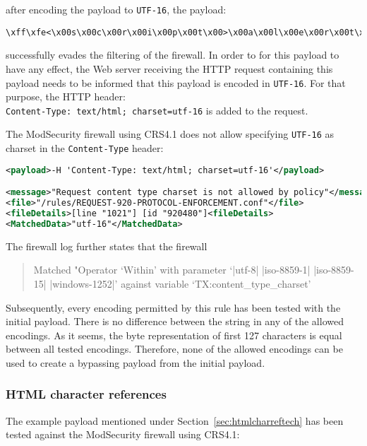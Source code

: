 after encoding the payload to \verb|UTF-16|, the payload:

\begin{lstlisting}[style=basicStyle]
\xff\xfe<\x00s\x00c\x00r\x00i\x00p\x00t\x00>\x00a\x00l\x00e\x00r\x00t\x00(\x00'\x00x\x00s\x00s\x00'\x00)\x00<\x00/\x00s\x00c\x00r\x00i\x00p\x00t\x00>\x00
\end{lstlisting}

successfully evades the filtering of the firewall. In order to for this payload to have any effect, the Web server receiving the HTTP request containing this payload needs to be informed that this payload is encoded in \verb|UTF-16|. For that purpose, the HTTP header: \\
\verb|Content-Type: text/html; charset=utf-16| is added to the request.

The ModSecurity firewall using CRS4.1 does not allow specifying \verb|UTF-16| as charset in the \verb|Content-Type| header:

\begin{lstlisting}[style=ruleStyle, language=XML, caption=utf-16 charset header blocked, label={lst:utf16charsetheaderblocked}]
<payload>-H 'Content-Type: text/html; charset=utf-16'</payload>

<message>"Request content type charset is not allowed by policy"</message>
<file>"/rules/REQUEST-920-PROTOCOL-ENFORCEMENT.conf"</file>
<fileDetails>[line "1021"] [id "920480"]<fileDetails>
<MatchedData>"utf-16"</MatchedData>
\end{lstlisting}

The firewall log further states that the firewall

\begin{quote}
	Matched "Operator `Within' with parameter `|utf-8| |iso-8859-1| |iso-8859-15| |windows-1252|' against variable `TX:content\_type\_charset'
\end{quote}

Subsequently, every encoding permitted by this rule has been tested with the initial payload. There is no difference between the string in any of the allowed encodings. As it seems, the byte representation of first 127 characters is equal between all tested encodings. \cite{enc/diffa, enc/diffb, enc/diffc} Therefore, none of the allowed encodings can be used to create a bypassing payload from the initial payload.


\subsubsection{HTML character references}
\label{sec:htmlcharrefsingleeva}
The example payload mentioned under Section~\ref{sec:htmlcharreftech} has been tested against the ModSecurity firewall using CRS4.1:

